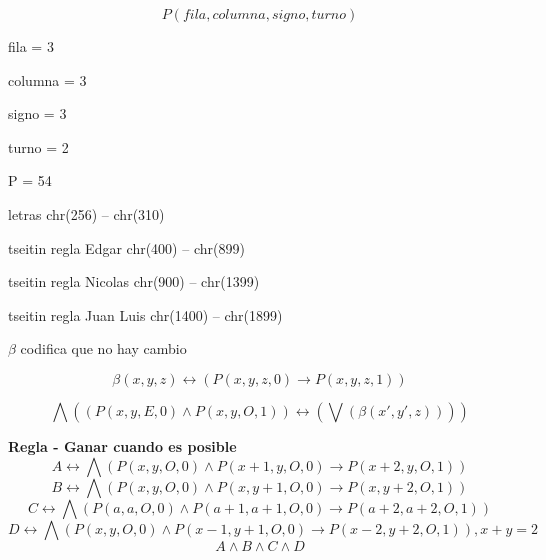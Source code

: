 \documentclass{minimal}
\begin{document}
\[
P(fila, columna, signo, turno)
\]


fila = 3

columna = 3

signo = 3

turno = 2

P = 54

letras chr(256) -- chr(310)

tseitin regla Edgar chr(400) -- chr(899)

tseitin regla Nicolas chr(900) -- chr(1399)

tseitin regla Juan Luis chr(1400) -- chr(1899)


$\beta$ codifica que no hay cambio


\[
\beta(x,y,z) \leftrightarrow ( P(x,y,z,0) \to P(x,y,z,1)  )
\]

\[
\bigwedge\left(   ( P(x,y,E,0) \wedge P(x,y,O,1)  ) \leftrightarrow (\bigvee( \beta(x',y',z)  ) )    \right)
\]

\textbf{Regla - Ganar cuando es posible}
\[A \leftrightarrow \bigwedge\left(P(x,y,O,0)\wedge P(x+1,y,O,0) \rightarrow P(x+2,y,O,1)\right)\]
\[B \leftrightarrow \bigwedge\left(P(x,y,O,0)\wedge P(x,y+1,O,0) \rightarrow P(x,y+2,O,1)\right)\]
\[C \leftrightarrow \bigwedge\left(P(a,a,O,0)\wedge P(a+1,a+1,O,0) \rightarrow P(a+2,a+2,O,1)\right)\]
\[D \leftrightarrow \bigwedge\left(P(x,y,O,0)\wedge P(x-1,y+1,O,0) \rightarrow P(x-2,y+2,O,1)\right), x+y=2\]
\[A\wedge B\wedge C\wedge D\]
\end{document}
